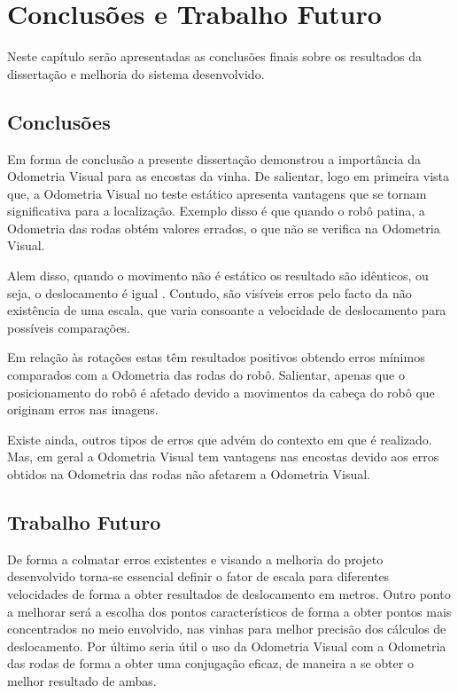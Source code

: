 \chapter{Conclusões e Trabalho Futuro} \label{chap:conclF}

Neste capítulo serão apresentadas as conclusões finais sobre os resultados da dissertação e melhoria do sistema desenvolvido.

\section{Conclusões}


Em forma de conclusão a presente dissertação demonstrou a importância da Odometria Visual para as encostas da vinha.
De salientar, logo em primeira vista que, a Odometria Visual no teste  estático apresenta vantagens  que se tornam significativa para a localização. Exemplo disso  é que quando o robô patina, a Odometria das rodas obtém valores errados, o que não se verifica na Odometria Visual.

Alem disso, quando o movimento não é estático os resultado são idênticos, ou seja, o deslocamento é igual . Contudo, são visíveis erros pelo facto da não existência de uma escala, que varia consoante a velocidade de deslocamento para possíveis comparações.

Em relação às rotações estas têm resultados positivos obtendo erros mínimos comparados com a Odometria das rodas do robô. Salientar, apenas que o posicionamento do robô é afetado devido a movimentos da cabeça do robô que originam erros nas imagens.

Existe ainda,  outros tipos de erros que advém do contexto em que é realizado. Mas, em geral a Odometria Visual tem vantagens nas encostas devido aos erros obtidos na Odometria das rodas não afetarem a Odometria Visual.

\section{Trabalho Futuro}


De forma a colmatar erros existentes e visando a melhoria do projeto desenvolvido torna-se essencial definir o fator de escala para diferentes velocidades de forma a obter resultados de deslocamento em metros. Outro ponto a melhorar será a escolha dos pontos característicos de forma a obter pontos mais concentrados no meio envolvido, nas vinhas para melhor precisão dos cálculos de deslocamento. Por último seria útil o uso da Odometria Visual com a Odometria das rodas de forma a obter uma conjugação eficaz, de maneira a se obter o melhor resultado de ambas.
